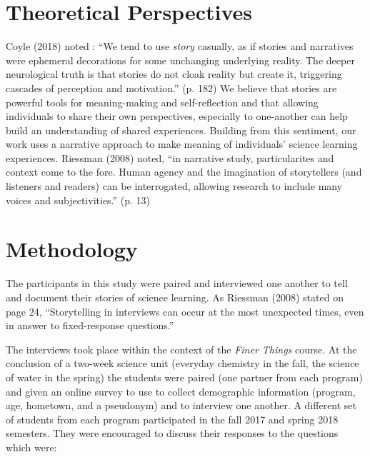 \documentclass[11pt]{sig-alternate}
\begin{document}
\begin{large}
\section*{Theoretical Perspectives}
Coyle (2018) noted : “We tend to use \textit{story} casually, as if stories and narratives were ephemeral decorations for some unchanging underlying reality. The deeper neurological truth is that stories do not cloak reality but create it, triggering cascades of perception and motivation.” (p. 182) We believe that stories are powerful tools for meaning-making and self-reflection and that allowing individuals to share their own perspectives, especially to one-another can help build an understanding of shared experiences. Building from this sentiment, our work uses a narrative approach to make meaning of individuals’ science learning experiences. Riessman (2008) noted, “in narrative study, particularites and context come to the fore. Human agency and the imagination of storytellers (and listeners and readers) can be interrogated, allowing research to include many voices and subjectivities.” (p. 13) 

\section*{Methodology}
 
The participants in this study were paired and interviewed one another to tell and document their stories of science learning. As Riessman (2008) stated on page 24, “Storytelling in interviews can occur at the most unexpected times, even in answer to fixed-response questions.” 

The interviews took place within the context of the \textit{Finer Things} course. At the conclusion of a two-week science unit (everyday chemistry in the fall, the science of water in the spring) the students were paired (one partner from each program) and given an online survey to use to collect demographic information (program, age, hometown, and a pseudonym) and to interview one another. A different set of students from each program participated in the fall 2017 and spring 2018 semesters. They were encouraged to discuss their responses to the questions which were:


\end{large}
\end{document}
